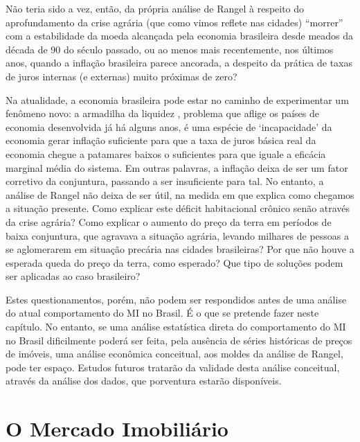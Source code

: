 \documentclass[
	12pt,				%
	oneside,			%
	a4paper,			%
	chapter=TITLE,		%
	section=TITLE,		%
	english,			%
	brazil				%
	]{abntex2}
\begin{document}
Não teria sido a vez, então, da própria análise de Rangel à respeito do
aprofundamento da crise agrária (que como vimos reflete nas cidades) ``morrer''
com a estabilidade da moeda alcançada pela economia brasileira desde meados da
década de 90 do século passado, ou ao menos mais recentemente, nos últimos anos,
quando a inflação brasileira parece ancorada, a despeito da prática de taxas de
juros internas (e externas) muito próximas de zero?

Na atualidade, a economia brasileira pode estar no caminho de experimentar um
fenômeno novo: a armadilha da liquidez \autocite[ver][]{krugman-emergentes}, problema que
aflige os países de economia desenvolvida já há alguns anos, é uma espécie de
`incapacidade' da economia gerar inflação suficiente para que a taxa de juros
básica real da economia chegue a patamares baixos o suficientes para que iguale
a eficácia marginal média do sistema. Em outras palavras, a inflação deixa de
ser um fator corretivo da conjuntura, passando a ser insuficiente para tal. No
entanto, a análise de Rangel não deixa de ser útil, na medida em que explica
como chegamos a situação presente. Como explicar este déficit habitacional
crônico senão através da crise agrária? Como explicar o aumento do preço da
terra em períodos de baixa conjuntura, que agravava a situação agrária, levando
milhares de pessoas a se aglomerarem em situação precária nas cidades
brasileiras? Por que não houve a esperada queda do preço da terra, como
esperado? Que tipo de soluções podem ser aplicadas ao caso brasileiro?

Estes questionamentos, porém, não podem ser respondidos antes de uma análise do
atual comportamento do \gls{MI} no Brasil. É o que se pretende fazer neste
capítulo. No entanto, se uma análise estatística direta do comportamento do
\gls{MI} no Brasil dificilmente poderá ser feita, pela ausência de séries
históricas de preços de imóveis, uma análise econômica conceitual, aos moldes da
análise de Rangel, pode ter espaço. Estudos futuros tratarão da validade desta
análise conceitual, através da análise dos dados, que porventura estarão
disponíveis.

\hypertarget{o-mercado-imobiliuxe1rio-1}{%
\section{O Mercado Imobiliário}\label{o-mercado-imobiliuxe1rio-1}}
\end{document}
